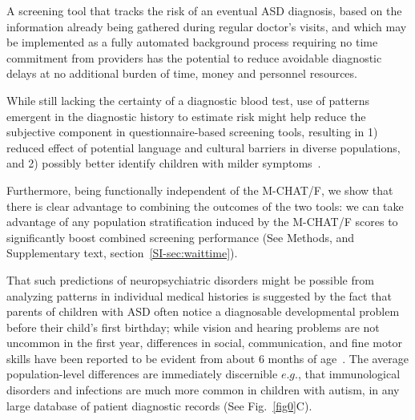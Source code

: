 \documentclass[onecolumn,,10pt]{IEEEtran}
\begin{document}
A  screening  tool that tracks the risk of an eventual ASD diagnosis,  based  on the information already being gathered during regular doctor's visits, and which may be implemented as a  fully automated background process requiring no time commitment from providers has the potential to reduce avoidable diagnostic  delays at no additional burden of time, money and personnel resources. 

While still lacking the certainty of a diagnostic blood test,  use of patterns emergent in  the diagnostic history to estimate risk might help reduce the subjective component in questionnaire-based screening tools, resulting in 1) reduced effect of potential language and cultural barriers in diverse populations, and 2) possibly better identify children with milder symptoms~\cite{hyman2020identification}.


Furthermore, being functionally independent of the M-CHAT/F, we show that there is clear advantage to combining the outcomes of the two tools: we can take advantage of any population stratification induced by the M-CHAT/F scores to significantly boost combined screening performance (See Methods, and Supplementary text, section~\ref{SI-sec:waittime}). 



That such  predictions  of neuropsychiatric  disorders might be possible  from analyzing patterns in individual medical histories   is suggested by the fact  that  parents of children with ASD often notice a diagnosable developmental problem before their child's first birthday; while vision and hearing problems are not uncommon in the first year,  differences in social, communication, and fine motor skills have been reported to be  evident from about 6 months of age~\cite{pmid21410398,cdc}. The average population-level differences are immediately discernible $e.g.$, that  immunological disorders  and infections are much more common in children with autism, in any large database of patient diagnostic records (See Fig.~\ref{fig0}C).
\end{document}
